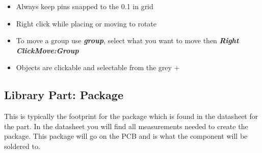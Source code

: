 \documentclass{article}
\begin{document}
\begin{tcolorbox} [title=Tips \& Tricks]
    \begin{itemize}
        \item Always keep pins snapped to the 0.1 in grid
        \item Right click while placing or moving to rotate
        \item To move a group use \textit{\textbf{group}}, select what you want to move then \textit{\textbf{Right Click\textrightarrow Move:Group}}
        \item Objects are clickable and selectable from the grey +
    \end{itemize}
\end{tcolorbox}

\subsection{Library Part: Package}
This is typically the footprint for the package which is found in the datasheet for the part. In the datasheet you will find all measurements needed to create the package. This package will go on the PCB and is what the component will be soldered to.
\end{document}
